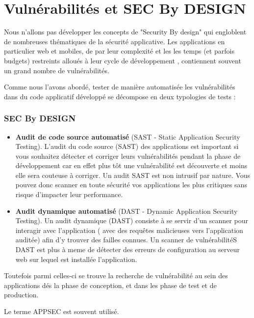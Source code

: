 
\section{Vulnérabilités et SEC By DESIGN}

Nous n'allons pas développer les concepts de "Security By design" qui  engloblent de nombreuses thématiques de la sécurité applicative.
Les applications en particulier web et mobiles, de par leur complexité et les les temps (et parfois budgets) restreints alloués à leur cycle de développement , contiennent souvent un grand nombre de vulnérabilités.

Comme nous l'avons abordé, tester de manière automatisée les vulnérabilités dans du code applicatif développé se décompose en deux typologies de tests :

\begin{frame}
\frametitle<presentation>{SEC By DESIGN}
\begin{itemize}
  \item  \textbf{Audit de code source automatisé} (SAST - Static Application Security Testing). L’audit du code source (SAST) des applications est important si vous souhaitez détecter et corriger leurs vulnérabilités pendant la phase de développement car en effet plus tôt une vulnérabilité est découverte et moins elle sera couteuse à corriger.
Un audit SAST est non intrusif par nature. Vous pouvez donc scanner en toute sécurité vos applications les plus critiques sans risque d’impacter leur performance.
  \item   \textbf{Audit dynamique automatisé }(DAST - Dynamic Application Security Testing). Un audit dynamique (DAST) consiste à se servir d’un scanner pour interagir avec l’application ( avec des requêtes malicieuses vers l’application auditée)  afin d’y trouver des failles connues.
Un scanner de vulnérabilitéS DAST est plus à meme de détecter des erreurs de configuration au serveur web sur lequel est installée l’application.

\end{itemize}
\end{frame}

Toutefois parmi celles-ci se trouve la recherche de vulnérabilité au sein des applications dés la phase de conception, et dans les phase de test et de production.

Le terme APPSEC est souvent utilisé.  
